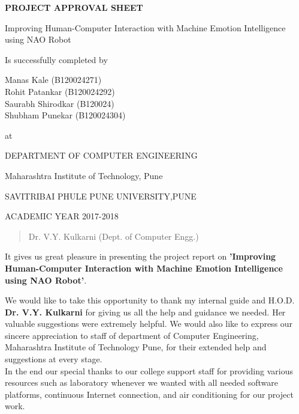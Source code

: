 \documentclass[oneside,a4paper,12pt]{report}
\begin{document}
\begin{center}
\textbf{PROJECT APPROVAL SHEET}
\end{center}
\begin{center}
Improving Human-Computer Interaction with Machine Emotion Intelligence using NAO Robot
\end{center}
\begin{center}
Is successfully completed by 
\end{center}
\begin{center}
Manas Kale         (B120024271) \\
Rohit Patankar     (B120024292)  \\
Saurabh Shirodkar  (B120024)  \\
Shubham Punekar    (B120024304) \\
\end{center}
\begin{center}
 at
 \end{center} 
 \begin{center}
 DEPARTMENT OF COMPUTER ENGINEERING
 \end{center}
 \begin{center}
 Maharashtra Institute of Technology, Pune
 \end{center}
 \begin{center}
 SAVITRIBAI PHULE PUNE UNIVERSITY,PUNE
 \end{center}
 
 \begin{center}
 ACADEMIC YEAR 2017-2018
 \end{center}
 \noindent
 \vspace{0,3 in}
 \begin{quote}
Dr. V.Y. Kulkarni (Dept. of Computer Engg.)
\end{quote}
\newpage

{   \setlength{\parindent}{11mm} }
\begin{center}
	It gives us great pleasure in presenting the project report 
		on 
		{\bfseries \fontsize{12}{12} \selectfont 'Improving Human-Computer Interaction with Machine Emotion Intelligence using NAO Robot'}.
	\vspace*{1.5\baselineskip}
	
	We would like to take this opportunity to thank my internal guide and H.O.D.
		\textbf{Dr. V.Y. Kulkarni} for giving us all the help and guidance we needed. Her valuable suggestions were extremely helpful. We would also like to express our sincere appreciation to staff of department of Computer Engineering, Maharashtra Institute of Technology Pune, for their extended help and suggestions at every stage.\\
	In the end our special thanks to our college support staff for providing various resources such as  laboratory whenever we wanted with all needed software platforms, continuous Internet connection, and air conditioning for our project work.
	\vspace*{1.5\baselineskip}
\end{center}
\end{document}
